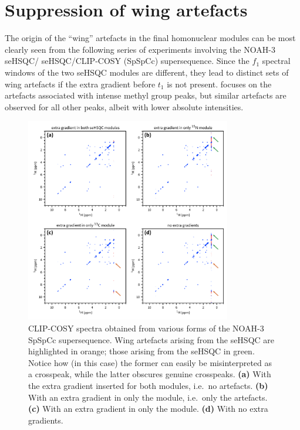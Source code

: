 \section{Suppression of wing artefacts}

The origin of the ``wing'' artefacts in the final homonuclear modules can be most clearly seen from the following series of experiments involving the NOAH-3 \nitrogen{} seHSQC/\carbon{} seHSQC/CLIP-COSY (SpSpCc) supersequence.
Since the $f_1$ spectral windows of the two seHSQC modules are different, they lead to distinct sets of wing artefacts if the extra gradient before $t_1$ is not present.
 focuses on the artefacts associated with intense methyl group peaks, but similar artefacts are observed for all other peaks, albeit with lower absolute intensities.

\begin{figure}
    \centering
    \includegraphics[width=0.8\textwidth]{./figures/wing_artefacts.png}
    \caption{
        CLIP-COSY spectra obtained from various forms of the NOAH-3 SpSpCc supersequence.
        Wing artefacts arising from the \nitrogen{} seHSQC are highlighted in orange; those arising from the \carbon{} seHSQC in green.
        Notice how (in this case) the former can easily be misinterpreted as a crosspeak, while the latter obscures genuine crosspeaks.
        \textbf{(a)} With the extra gradient inserted for both modules, i.e.\ no artefacts.
        \textbf{(b)} With an extra gradient in only the \nitrogen{} module, i.e.\ only the \carbon{} artefacts.
        \textbf{(c)} With an extra gradient in only the \carbon{} module.
        \textbf{(d)} With no extra gradients.
        \grami{}
    }
    \label{fig:wing_artefacts}
\end{figure}


